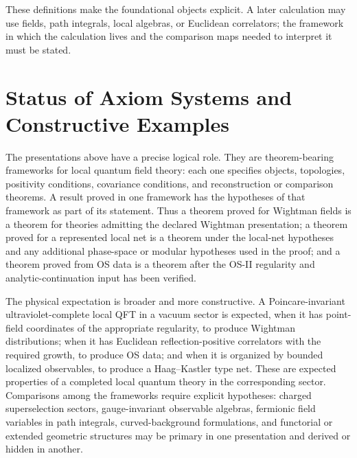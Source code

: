 These definitions make the foundational objects explicit.  A later
calculation may use fields, path integrals, local algebras, or Euclidean
correlators; the framework in which the calculation lives and the comparison
maps needed to interpret it must be stated.

\section{Status of Axiom Systems and Constructive Examples}
\label{sec:status-axiom-systems-constructive-examples}

The presentations above have a precise logical role.  They are theorem-bearing
frameworks for local quantum field theory: each one specifies objects,
topologies, positivity conditions, covariance conditions, and reconstruction
or comparison theorems.  A result proved in one framework has the hypotheses
of that framework as part of its statement.  Thus a theorem proved for
Wightman fields is a theorem for theories admitting the declared Wightman
presentation; a theorem proved for a represented local net is a theorem under
the local-net hypotheses and any additional phase-space or modular hypotheses
used in the proof; and a theorem proved from OS data is a theorem after the
OS-II regularity and analytic-continuation input has been verified.

The physical expectation is broader and more constructive.  A
Poincare-invariant ultraviolet-complete local QFT in a vacuum sector is
expected, when it has point-field coordinates of the appropriate regularity,
to produce Wightman distributions; when it has Euclidean reflection-positive
correlators with the required growth, to produce OS data; and when it is
organized by bounded localized observables, to produce a Haag--Kastler type
net.  These are expected properties of a completed local quantum theory in the
corresponding sector.  Comparisons among the frameworks require explicit
hypotheses: charged superselection sectors, gauge-invariant observable
algebras, fermionic field variables in path integrals, curved-background
formulations, and functorial or extended geometric structures may be primary
in one presentation and derived or hidden in another.

